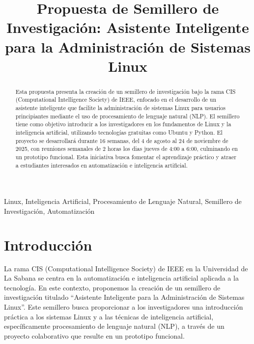 \documentclass[conference, a4paper]{IEEEtran}
\begin{document}
\title{Propuesta de Semillero de Investigación: Asistente Inteligente para la Administración de Sistemas Linux}

\author{

}

\maketitle

\begin{abstract}
Esta propuesta presenta la creación de un semillero de investigación bajo la rama CIS (Computational Intelligence Society) de IEEE, enfocado en el 
desarrollo de un asistente inteligente que facilite la administración de sistemas Linux para usuarios principiantes mediante el uso de procesamiento 
de lenguaje natural (NLP). El semillero tiene como objetivo introducir a los investigadores en los fundamentos de Linux y la inteligencia artificial, 
utilizando tecnologías gratuitas como Ubuntu y Python. El proyecto se desarrollará durante 16 semanas, del 4 de agosto al 24 de 
noviembre de 2025, con reuniones semanales de 2 horas los dias jueves de 4:00 a 6:00, culminando en un prototipo funcional. Esta iniciativa busca 
fomentar el aprendizaje práctico y atraer a estudiantes interesados en automatización e inteligencia artificial.
\end{abstract}

\begin{IEEEkeywords}
Linux, Inteligencia Artificial, Procesamiento de Lenguaje Natural, Semillero de Investigación, Automatización
\end{IEEEkeywords}

\section{Introducción}
La rama CIS (Computational Intelligence Society) de IEEE en la Universidad de La Sabana se centra en la automatización e inteligencia artificial aplicada 
a la tecnología. En este contexto, proponemos la creación de un semillero de investigación titulado ``Asistente Inteligente para la Administración de 
Sistemas Linux''. Este semillero busca proporcionar a los investigadores una introducción práctica a los sistemas Linux y a las técnicas de 
inteligencia artificial, específicamente procesamiento de lenguaje natural (NLP), a través de un proyecto colaborativo que resulte en un prototipo 
funcional.
\end{document}
